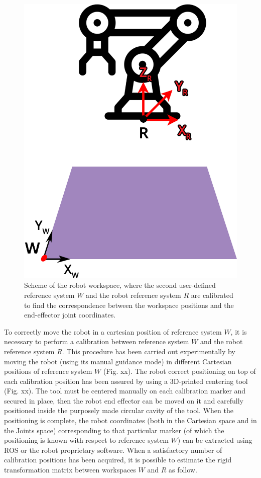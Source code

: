 \documentclass[letterpaper, 10 pt, conference]{ieeeconf}  %
\begin{document}
\begin{figure} [h!]
  \centering
  \includegraphics[width=0.6\columnwidth]{figures/w2.png}
  \caption{Scheme of the robot workspace, where the second user-defined reference system $W$ and the robot reference system $R$ are calibrated to find the correspondence between the workspace positions and the end-effector joint coordinates.}
  \label{fig:w2}
\end{figure}

To correctly move the robot in a cartesian position of reference system $W$, it is necessary to perform a calibration between reference system $W$ and the robot reference system $R$. This procedure has been carried out experimentally by moving the robot (using its manual guidance mode) in different Cartesian positions of reference system $W$ (Fig. xx). %
The robot correct positioning on top of each calibration position has been assured by using a 3D-printed centering tool (Fig. xx). The tool must be centered manually on each calibration marker and secured in place, then the robot end effector can be moved on it and carefully positioned inside the purposely made circular cavity of the tool. When the positioning is complete, the robot coordinates (both in the Cartesian space and in the Joints space) corresponding to that particular marker (of which the positioning is known with respect to reference system $W$) can be extracted using ROS or the robot proprietary software. When a satisfactory number of calibration positions has been acquired, it is possible to estimate the rigid transformation matrix between workspaces $W$ and $R$ as follow.
\end{document}
